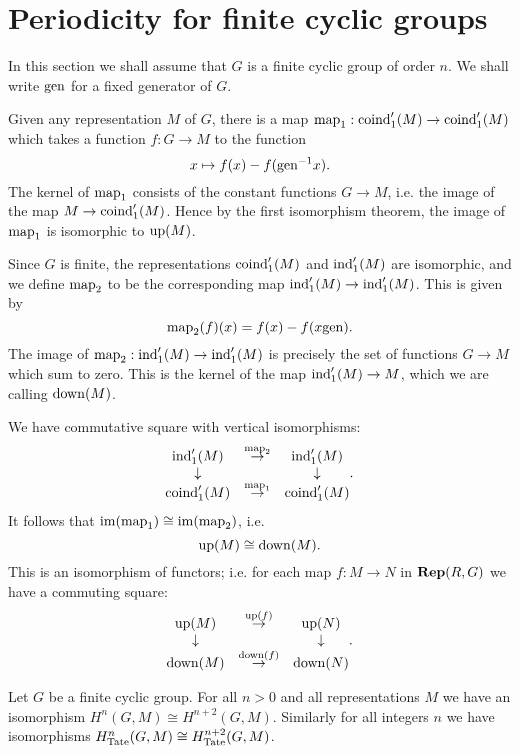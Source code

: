 \section{Periodicity for finite cyclic groups}

In this section we shall assume that $G$ is a finite cyclic group of order $n$.
We shall write $\mathrm{gen}$ for a fixed generator of $G$.

\begin{definition} \label{def:up iso down}
	Given any representation $M$ of $G$, there is a map
	$\mathrm{map}_1 : \mathrm{coind}_1'(M) \to \mathrm{coind}_1'(M)$ which takes a function $f : G \to M$ to the function
	\[
		x \mapsto f(x) - f(\mathrm{gen}^{-1}x).
	\]
	The kernel of $\mathrm{map}_1$ consists of the constant functions $G \to M$, i.e. the image of the
	map $M \to \mathrm{coind}_1'(M)$.
	Hence by the first isomorphism theorem, the image of $\mathrm{map}_1$ is isomorphic to $\mathrm{up}(M)$.

	Since $G$ is finite, the representations $\mathrm{coind}_1'(M)$ and $\mathrm{ind}_1'(M)$
	are isomorphic, and we define $\mathrm{map}_2$ to be the corresponding map $\mathrm{ind}_1'(M) \to \mathrm{ind}_1'(M)$.
	This is given by
	\[
		\mathrm{map}_2(f) (x) = f(x) - f(x\mathrm{gen}).
	\]
	The image of $\mathrm{map}_2 : \mathrm{ind}_1'(M) \to \mathrm{ind}_1'(M)$ is precisely the set of functions $G \to M$
	which sum to zero. This is the kernel of the map $\mathrm{ind}_1'(M) \to M$,
	which we are calling $\mathrm{down}(M)$.

	We have commutative square with vertical isomorphisms:
	\[
		\begin{matrix}
			\mathrm{ind}_1'(M) & \stackrel{\mathrm{map}_2}\to & \mathrm{ind}_1'(M) \\
			\downarrow && \downarrow \\
			\mathrm{coind}_1'(M) & \stackrel{\mathrm{map}_1}\to & \mathrm{coind}_1'(M) \\
		\end{matrix}.
	\]
	It follows that $\mathrm{im}(\mathrm{map}_1) \cong \mathrm{im}(\mathrm{map}_2)$,
	i.e.
	\[
		\mathrm{up}(M) \cong \mathrm{down}(M).
	\]
	This is an isomorphism of functors; i.e. for each map $f : M \to N$ in $\mathbf{Rep}(R,G)$
	we have a commuting square:
	\[
		\begin{matrix}
			\mathrm{up}(M) & \stackrel{\mathrm{up}(f)}\to & \mathrm{up}(N) \\
			\downarrow && \downarrow \\
			\mathrm{down}(M) & \stackrel{\mathrm{down}(f)}\to & \mathrm{down}(N)
		\end{matrix}.
	\]
\end{definition}

\begin{corollary} \label{cor:periodic cohomology}
	Let $G$ be a finite cyclic group.
	For all $n > 0$ and all representations $M$
	we have an isomorphism $H^{n}(G,M) \cong H^{n+2}(G,M)$.
	Similarly for all integers $n$ we have isomorphisms $H^{n}_{\mathrm{Tate}}(G,M) \cong H^{n+2}_{\mathrm{Tate}}(G,M)$.
\end{corollary}


